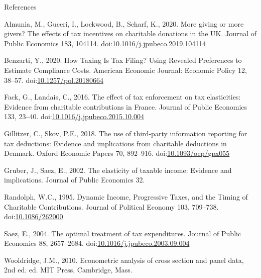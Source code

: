 \documentclass[
  ignorenonframetext,
  aspectratio=169,
]{beamer}
\newlength{\cslhangindent}
\newlength{\cslentryspacingunit} %
\newenvironment{CSLReferences}[2] %
 {%
  \setlength{\parindent}{0pt}
  \ifodd #1
  \let\oldpar\par
  \def\par{\hangindent=\cslhangindent\oldpar}
  \fi
  \setlength{\parskip}{#2\cslentryspacingunit}
 }%
 {}
\begin{document}
\begin{frame}{References}
\hypertarget{refs}{}
\begin{CSLReferences}{1}{0}
\leavevmode{}%
Almunia, M., Guceri, I., Lockwood, B., Scharf, K., 2020. More giving or more givers? {The} effects of tax incentives on charitable donations in the {UK}. Journal of Public Economics 183, 104114. doi:\href{https://doi.org/10.1016/j.jpubeco.2019.104114}{10.1016/j.jpubeco.2019.104114}

\leavevmode{}%
Benzarti, Y., 2020. How {Taxing Is Tax Filing}? {Using Revealed Preferences} to {Estimate Compliance Costs}. American Economic Journal: Economic Policy 12, 38--57. doi:\href{https://doi.org/10.1257/pol.20180664}{10.1257/pol.20180664}

\leavevmode{}%
Fack, G., Landais, C., 2016. The effect of tax enforcement on tax elasticities: {Evidence} from charitable contributions in {France}. Journal of Public Economics 133, 23--40. doi:\href{https://doi.org/10.1016/j.jpubeco.2015.10.004}{10.1016/j.jpubeco.2015.10.004}

\leavevmode{}%
Gillitzer, C., Skov, P.E., 2018. The use of third-party information reporting for tax deductions: Evidence and implications from charitable deductions in {Denmark}. Oxford Economic Papers 70, 892--916. doi:\href{https://doi.org/10.1093/oep/gpx055}{10.1093/oep/gpx055}

\leavevmode{}%
Gruber, J., Saez, E., 2002. The elasticity of taxable income: Evidence and implications. Journal of Public Economics 32.

\leavevmode{}%
Randolph, W.C., 1995. Dynamic {Income}, {Progressive Taxes}, and the {Timing} of {Charitable Contributions}. Journal of Political Economy 103, 709--738. doi:\href{https://doi.org/10.1086/262000}{10.1086/262000}

\leavevmode{}%
Saez, E., 2004. The optimal treatment of tax expenditures. Journal of Public Economics 88, 2657--2684. doi:\href{https://doi.org/10.1016/j.jpubeco.2003.09.004}{10.1016/j.jpubeco.2003.09.004}

\leavevmode{}%
Wooldridge, J.M., 2010. Econometric analysis of cross section and panel data, 2nd ed. ed. {MIT Press}, {Cambridge, Mass}.

\end{CSLReferences}
\end{frame}
\end{document}
